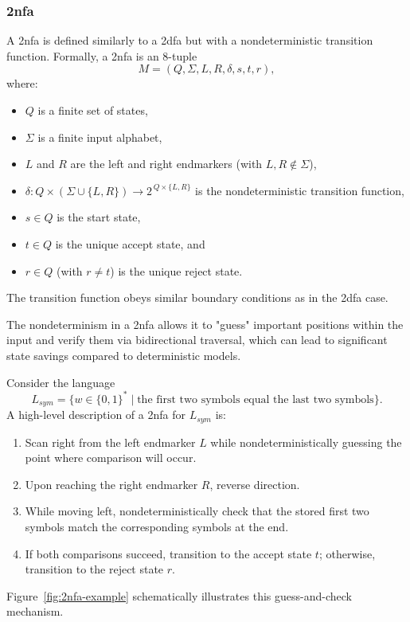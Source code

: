
\subsubsection{\acrfull{2nfa}}
\label{subsubsec:2nfa}

\begin{definition}
A \gls{2nfa} is defined similarly to a \gls{2dfa} but with a nondeterministic transition function. Formally, a \gls{2nfa} is an 8-tuple
\[
M = (Q, \Sigma, L, R, \delta, s, t, r),
\]
where:
\begin{itemize}
    \item \(Q\) is a finite set of states,
    \item \(\Sigma\) is a finite input alphabet,
    \item \(L\) and \(R\) are the left and right endmarkers (with \(L,R\notin\Sigma\)),
    \item \(\delta: Q \times (\Sigma \cup \{L,R\}) \to 2^{\,Q \times \{L,R\}}\) is the nondeterministic transition function,
    \item \(s\in Q\) is the start state,
    \item \(t\in Q\) is the unique accept state, and
    \item \(r\in Q\) (with \(r\neq t\)) is the unique reject state.
\end{itemize}
The transition function obeys similar boundary conditions as in the \gls{2dfa} case.
\end{definition}

\begin{remark}
The nondeterminism in a \gls{2nfa} allows it to "guess" important positions within the input and verify them via bidirectional traversal, which can lead to significant state savings compared to deterministic models.
\end{remark}

\begin{example}
Consider the language 
\[
L_{sym} = \{ w \in \{0,1\}^* \mid \text{the first two symbols equal the last two symbols} \}.
\]
A high-level description of a \gls{2nfa} for \(L_{sym}\) is:
\begin{enumerate}
    \item Scan right from the left endmarker \(L\) while nondeterministically guessing the point where comparison will occur.
    \item Upon reaching the right endmarker \(R\), reverse direction.
    \item While moving left, nondeterministically check that the stored first two symbols match the corresponding symbols at the end.
    \item If both comparisons succeed, transition to the accept state \(t\); otherwise, transition to the reject state \(r\).
\end{enumerate}
Figure~\ref{fig:2nfa-example} schematically illustrates this guess-and-check mechanism.
\end{example}

